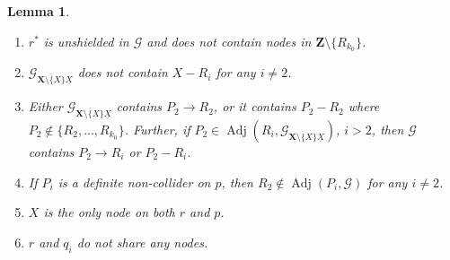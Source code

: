 \documentclass[11pt]{article}
\DeclareMathOperator{\Adj}{Adj}
\newtheorem{lemma}[theorem]{Lemma}
\newcommand{\mb}[1]{\mathbf{#1}}
\newcommand{\g}[1][G]{\mathcal{#1}}
\begin{document}
\begin{lemma}
\begin{enumerate}[label = (\roman*)]
        \item\label{rprop1} $r^*$ is unshielded in $\g$ and does not contain nodes in $\mb{Z} \setminus \{R_{k_0}\}$.

        \item\label{rprop2} $\g_{\overline{\mb{X} \setminus \{X\}} \underline{X}}$ does not contain $X - R_i$ for any $i \neq 2$.

        \item\label{rprop3} Either $\g_{\overline{\mb{X} \setminus \{X\}} \underline{X}}$ contains $P_2 \to R_2$, or it contains $P_2 - R_2$ where $P_2 \notin \{R_2, \dots, R_{k_0}\}$. Further, if $P_2 \in \Adj(R_i, \g_{\overline{\mb{X} \setminus \{X\}} \underline{X}})$, $i >2$, then $\g$ contains $P_2 \to R_i$ or $P_2 - R_i$.

        \item\label{rprop4p} If $P_i$ is a definite non-collider on $p$, then $R_2 \notin \Adj(P_i, \g)$ for any $i \neq 2$.

        \item\label{rprop4} $X$ is the only node on both $r$ and $p$.

        \item\label{rprop5} $r$ and $q_i$ do not share any nodes.
    \end{enumerate}
\end{lemma}
\end{document}
